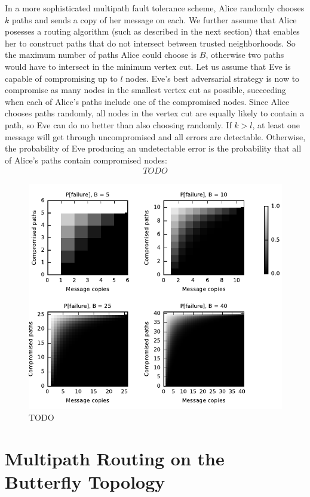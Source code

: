 \documentclass[prodmode,permissions]{acmsmall-ec16}
\newcommand{\beq}{\begin{eqnarray}}
\newcommand{\eeq}{\end{eqnarray}}
\begin{document}
In a more sophisticated multipath fault tolerance scheme,
Alice randomly chooses $k$ paths and sends a copy of
her message on each.
We further assume that Alice posesses a routing algorithm
(such as described in the next section)
that enables her to construct paths that
do not intersect between trusted neighborhoods.
So the maximum number of paths Alice could choose is $B$,
otherwise two paths would have to intersect in the minimum vertex cut.
Let us assume that Eve is capable of compromising up to $l$ nodes.
Eve's best adversarial strategy is now to compromise as many nodes in the smallest
vertex cut as possible,
succeeding when each of Alice's paths include one of the compromised nodes.
Since Alice chooses paths randomly,
all nodes in the vertex cut are equally likely to contain a path,
so Eve can do no better than also choosing randomly.
If $k > l$, at least one message will get through uncompromised and all
errors are detectable.
Otherwise, the probability of Eve producing an undetectable error is
the probability that all of Alice's paths contain compromised nodes:
\beq
TODO
\eeq

\begin{figure}
\centerline{\includegraphics{fig-perror}}
\caption{TODO}
\label{fig:one}
\end{figure}

\section{Multipath Routing on the Butterfly Topology}
\end{document}
